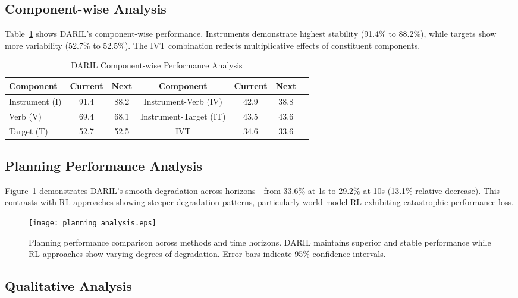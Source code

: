 \documentclass[runningheads]{llncs}
\begin{document}
\subsection{Component-wise Analysis}

Table~\ref{tab:component_analysis} shows DARIL's component-wise performance. Instruments demonstrate highest stability (91.4\% to 88.2\%), while targets show more variability (52.7\% to 52.5\%). The IVT combination reflects multiplicative effects of constituent components.

\begin{table}[h]
\centering
\caption{DARIL Component-wise Performance Analysis}
\label{tab:component_analysis}
\begin{tabular}{lcccccc}
\toprule
\textbf{Component} & \textbf{Current} & \textbf{Next} & \textbf{Component} & \textbf{Current} & \textbf{Next} \\
\midrule
Instrument (I) & 91.4 & 88.2 & Instrument-Verb (IV) & 42.9 & 38.8 \\
Verb (V) & 69.4 & 68.1 & Instrument-Target (IT) & 43.5 & 43.6 \\
Target (T) & 52.7 & 52.5 & IVT & 34.6 & 33.6 \\
\bottomrule
\end{tabular}
\end{table}

\subsection{Planning Performance Analysis}

Figure~\ref{fig:planning_analysis} demonstrates DARIL's smooth degradation across horizons—from 33.6\% at 1s to 29.2\% at 10s (13.1\% relative decrease). This contrasts with RL approaches showing steeper degradation patterns, particularly world model RL exhibiting catastrophic performance loss.

\begin{figure}[h]
\centering
\texttt{[image: planning\_analysis.eps]}
\caption{Planning performance comparison across methods and time horizons. DARIL maintains superior and stable performance while RL approaches show varying degrees of degradation. Error bars indicate 95\% confidence intervals.}
\label{fig:planning_analysis}
\end{figure}

\subsection{Qualitative Analysis}
\end{document}
